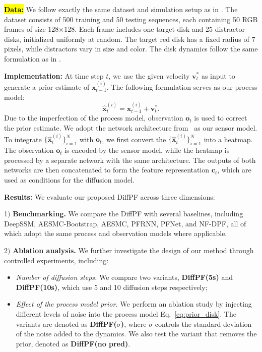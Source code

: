 \textbf{\hl{Data:}} 
We follow exactly the same dataset and simulation setup as in \cite{chen2024normalizing}. The dataset consists of 500 training and 50 testing sequences, each containing 50 RGB frames of size 128×128. Each frame includes one target disk and 25 distractor disks, initialized uniformly at random. The target red disk has a fixed radius of 7 pixels, while distractors vary in size and color. The disk dynamics follow the same formulation as in \cite{kloss2021train}.

\textbf{Implementation:} 
At time step $t$, we use the given velocity $\bm{v}_t^*$ as input to generate a prior estimate of $\bm{x}_{t-1}^{(i)}$. The following formulation serves as our process model:
\begin{equation}
    \hat{\bm{x}}_{t}^{(i)} = \bm{x}_{t-1}^{(i)} + \bm{v}_t^*.
    \label{eq:prior_disk}
\end{equation}
Due to the imperfection of the process model, observation $\bm{o}_t$ is used to correct the prior estimate. We adopt the network architecture from~\cite{chen2024normalizing} as our sensor model.
To integrate $\{\hat{\bm{x}}_t^{(i)}\}_{i=1}^N$ with $\bm{o}_t$, we first convert the $\{\hat{\bm{x}}_t^{(i)}\}_{i=1}^N$ into a heatmap. The observation $\bm{o}_t$ is encoded by the sensor model, while the heatmap is processed by a separate network with the same architecture. The outputs of both networks are then concatenated to form the feature representation $\bm{c}_t$, which are used as conditions for the diffusion model. 

\textbf{Results:} We evaluate our proposed DiffPF across three dimensions:

1$)$ \textbf{Benchmarking.} We compare the DiffPF with several baselines, including DeepSSM, AESMC-Bootstrap, AESMC, PFRNN, PFNet, and NF-DPF, all of which adopt the same process and observation models where applicable.

2$)$ \textbf{Ablation analysis.} We further investigate the design of our method through controlled experiments, including:
\begin{itemize}
    \item \textit{Number of diffusion steps.} We compare two variants, \textbf{DiffPF(5s)} and \textbf{DiffPF(10s)}, which use 5 and 10 diffusion steps respectively;
    \item \textit{Effect of the process model prior.} We perform an ablation study by injecting different levels of noise into the process model Eq.~\ref{eq:prior_disk}. The variants are denoted as \textbf{DiffPF($\sigma$)}, where $\sigma$ controls the standard deviation of the noise added to the dynamics. We also test the variant that removes the prior, denoted as \textbf{DiffPF(no pred)}.
\end{itemize}

